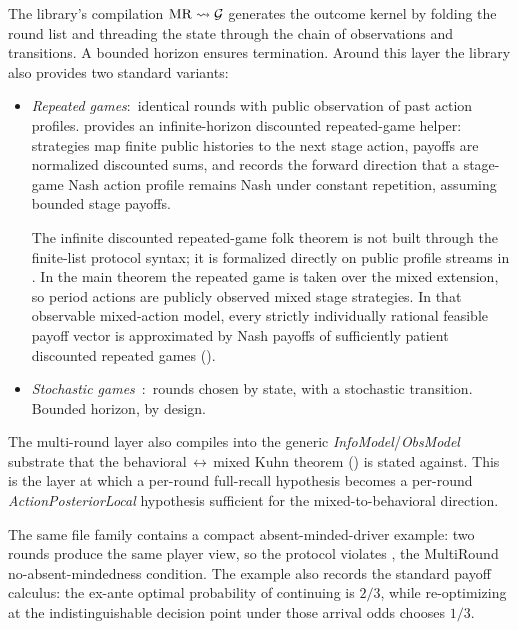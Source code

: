 The library's compilation $\mathrm{MR} \rightsquigarrow \mathcal{G}$ generates the
outcome kernel by folding the round list and threading the state
through the chain of observations and transitions.  A bounded
horizon ensures termination.  Around this layer the library also
provides two standard variants:
\begin{itemize}\itemsep2pt
\item \emph{Repeated games}:\ identical rounds with public
observation of past action profiles.  
provides an infinite-horizon discounted repeated-game helper:
strategies map finite public histories to the next stage action,
payoffs are normalized discounted sums, and
 records the forward direction
that a stage-game Nash action profile remains Nash under constant
repetition, assuming bounded stage payoffs.

The infinite discounted repeated-game folk theorem is not built
through the finite-list protocol syntax; it is formalized directly
on public  profile streams in
.  In the main theorem the repeated
game is taken over the mixed extension, so period actions are
publicly observed mixed stage strategies.  In that observable
mixed-action model, every strictly individually rational feasible
payoff vector is approximated by Nash payoffs of sufficiently
patient discounted repeated games ().

\item \emph{Stochastic games}~\citep{Shapley1953stochastic}:\
rounds chosen by state, with a stochastic transition.  Bounded
horizon, by design.
\end{itemize}

The multi-round layer also compiles into the generic
\emph{InfoModel}/\emph{ObsModel} substrate that the
behavioral$\,\leftrightarrow\,$mixed Kuhn theorem
() is stated against.  This is the layer
at which a per-round full-recall hypothesis becomes a per-round
\emph{ActionPosteriorLocal} hypothesis sufficient for the
mixed-to-behavioral direction.

The same file family contains a compact absent-minded-driver example:
two rounds produce the same player view, so the protocol violates
\TT{ViewDeterminesRound}, the MultiRound no-absent-mindedness
condition.  The example also records the standard payoff calculus:
the ex-ante optimal probability of continuing is $2/3$, while
re-optimizing at the indistinguishable decision point under those
arrival odds chooses $1/3$.


